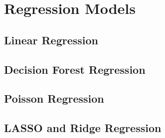 \section{Regression Models}
\subsection{Linear Regression}
\subsection{Decision Forest Regression}
\subsection{Poisson Regression}
\subsection{LASSO and Ridge Regression}